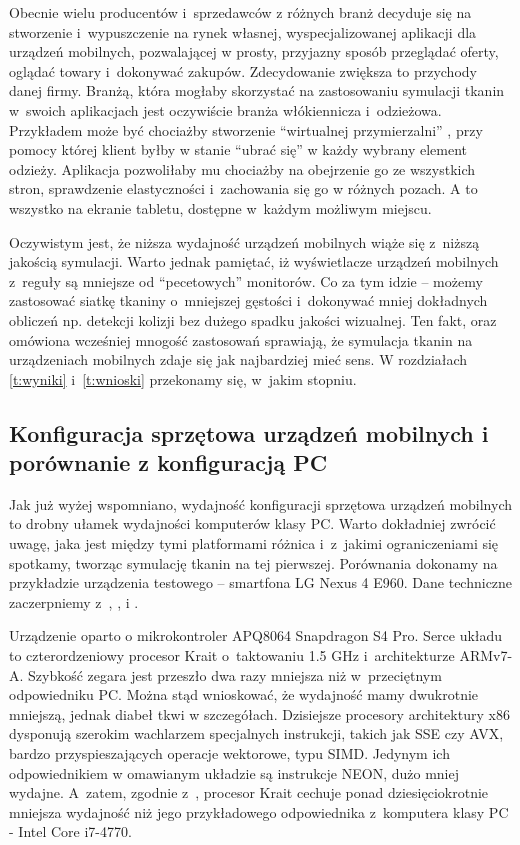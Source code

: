 		Obecnie wielu producentów i~sprzedawców z różnych branż decyduje się na stworzenie i~wypuszczenie na rynek własnej, wyspecjalizowanej aplikacji dla urządzeń mobilnych, pozwalającej w prosty, przyjazny sposób przeglądać oferty, oglądać towary i~dokonywać zakupów. Zdecydowanie zwiększa to przychody danej firmy. Branżą, która mogłaby skorzystać na zastosowaniu symulacji tkanin w~swoich aplikacjach jest oczywiście branża włókiennicza i~odzieżowa. Przykładem może być chociażby stworzenie ``wirtualnej przymierzalni'' \cite{tryon}, przy pomocy której klient byłby w stanie ``ubrać się'' w każdy wybrany element odzieży. Aplikacja pozwoliłaby mu chociażby na obejrzenie go ze wszystkich stron, sprawdzenie elastyczności i~zachowania się go w różnych pozach. A to wszystko na ekranie tabletu, dostępne w~każdym możliwym miejscu. 
		
		Oczywistym jest, że niższa wydajność urządzeń mobilnych wiąże się z~niższą jakością symulacji. Warto jednak pamiętać, iż wyświetlacze urządzeń mobilnych z~reguły są mniejsze od ``pecetowych'' monitorów. Co za tym idzie -- możemy zastosować siatkę tkaniny o~mniejszej gęstości i~dokonywać mniej dokładnych obliczeń np. detekcji kolizji bez dużego spadku jakości wizualnej. Ten fakt, oraz omówiona wcześniej mnogość zastosowań sprawiają, że symulacja tkanin na urządzeniach mobilnych zdaje się jak najbardziej mieć sens. W rozdziałach \ref{t:wyniki} i~\ref{t:wnioski} przekonamy się, w~jakim stopniu.
	
		\subsection{Konfiguracja sprzętowa urządzeń mobilnych i porównanie z konfiguracją PC}
		\label{t:technologie:mobilne:konfiguracja}
		
		
		Jak już wyżej wspomniano, wydajność konfiguracji sprzętowa urządzeń mobilnych to drobny ułamek wydajności komputerów klasy PC. Warto dokładniej zwrócić uwagę, jaka jest między tymi platformami różnica i~z~jakimi ograniczeniami się spotkamy, tworząc symulację tkanin na tej pierwszej. Porównania dokonamy na przykładzie urządzenia testowego -- smartfona LG Nexus 4 E960. Dane techniczne zaczerpniemy z~\cite{specs}, \cite{specs_adreno}, \cite{specs_gtx750} i \cite{specs_gtxtitan}. 
		
		Urządzenie oparto o mikrokontroler APQ8064 Snapdragon S4 Pro. Serce układu to czterordzeniowy procesor Krait o~taktowaniu 1.5 GHz i~architekturze ARMv7-A. Szybkość zegara jest przeszło dwa razy mniejsza niż w~przeciętnym odpowiedniku PC. Można stąd wnioskować, że wydajność mamy dwukrotnie mniejszą, jednak diabeł tkwi w szczegółach. Dzisiejsze procesory architektury x86 dysponują szerokim wachlarzem specjalnych instrukcji, takich jak SSE czy AVX, bardzo przyspieszających operacje wektorowe, typu SIMD. Jedynym ich odpowiednikiem w omawianym układzie są instrukcje NEON, dużo mniej wydajne. A~zatem, zgodnie z~\cite{versus}, procesor Krait cechuje ponad dziesięciokrotnie mniejsza wydajność niż jego przykładowego odpowiednika z~komputera klasy PC - Intel Core i7-4770.
		
